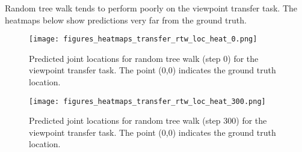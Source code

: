 \documentclass[runningheads]{llncs}
\begin{document}
	
	\newpage
	\noindent Random tree walk tends to perform poorly on the viewpoint transfer task. The heatmaps below show predictions very far from the ground truth.
	\vspace{-3mm}
	\begin{figure}[h!]
		\centering
		\texttt{[image: figures\_heatmaps\_transfer\_rtw\_loc\_heat\_0.png]}
		\vspace{-6mm}
		\caption{Predicted joint locations for random tree walk (step 0) for the viewpoint transfer task. The point (0,0) indicates the ground truth location.}\label{fig:rtw_0}
		\vspace{2mm}
		\texttt{[image: figures\_heatmaps\_transfer\_rtw\_loc\_heat\_300.png]}
		\vspace{-6mm}
		\caption{Predicted joint locations for random tree walk (step 300) for the viewpoint transfer task. The point (0,0) indicates the ground truth location.}
	\end{figure}
	\vspace{-3mm}
\end{document}
